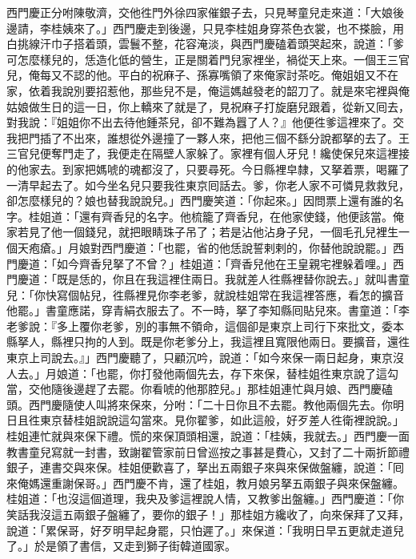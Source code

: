 西門慶正分咐陳敬濟，交他徃門外徐四家催銀子去，只見琴童兒走來道：「大娘後邊請，李桂姨來了。」西門慶走到後邊，只見李桂姐身穿茶色衣裳，也不搽臉，用白挑線汗巾子搭着頭，雲鬟不整，花容淹淡，與西門慶磕着頭哭起來，說道：「爹可怎麼樣兒的，恁造化低的營生，正是關着門兒家裡坐，禍從天上來。一個王三官兒，俺每又不認的他。平白的祝麻子、孫寡嘴領了來俺家討茶吃。俺姐姐又不在家，依着我說別要招惹他，那些兒不是，{}俺這媽越發老的韶刀了。就是來宅裡與俺姑娘做生日的這一日，你上轎來了就是了，見祝麻子打旋磨兒跟着，從新又囘去，對我說：『姐姐你不出去待他鍾茶兒，卻不難為囂了人？』他便徃爹這裡來了。交我把門插了不出來，誰想從外邊撞了一夥人來，把他三個不繇分說都拏的去了。王三官兒便奪門走了，我便走在隔壁人家躲了。家裡有個人牙兒！纔使保兒來這裡接的他家去。到家把媽唬的魂都沒了，只要尋死。今日縣裡皁隸，又拏着票，喝羅了一清早起去了。如今坐名兒只要我徃東京囘話去。爹，你老人家不可憐見救救兒，卻怎麼樣兒的？娘也替我說說兒。」{}西門慶笑道：「你起來。」因問票上還有誰的名字。桂姐道：「還有齊香兒的名字。他梳籠了齊香兒，在他家使錢，他便該當。{}俺家若見了他一個錢兒，就把眼睛珠子吊了；若是沾他沾身子兒，一個毛孔兒裡生一個天疱瘡。」月娘對西門慶道：「也罷，省的他恁說誓剌剌的，你替他說說罷。」西門慶道：「如今齊香兒拏了不曾？」桂姐道：「齊香兒他在王皇親宅裡躲着哩。」西門慶道：「既是恁的，你且在我這裡住兩日。我就差人徃縣裡替你說去。」就叫書童兒：「你快寫個帖兒，徃縣裡見你李老爹，就說桂姐常在我這裡答應，看怎的擴音他罷。」書童應諾，穿青絹衣服去了。不一時，拏了李知縣囘貼兒來。書童道：「李老爹說：『多上覆你老爹，別的事無不領命，這個卻是東京上司行下來批文，委本縣拏人，縣裡只拘的人到。既是你老爹分上，我這裡且寬限他兩日。要擴音，還徃東京上司說去。』」西門慶聽了，只顧沉吟，說道：「如今來保一兩日起身，東京沒人去。」月娘道：「也罷，你打發他兩個先去，存下來保，替桂姐徃東京說了這勾當，交他隨後邊趕了去罷。你看唬的他那腔兒。」那桂姐連忙與月娘、西門慶磕頭。{}西門慶隨使人叫將來保來，分咐：「二十日你且不去罷。教他兩個先去。你明日且徃東京替桂姐說說這勾當來。見你翟爹，如此這般，好歹差人徃衛裡說說。」桂姐連忙就與來保下禮。慌的來保頂頭相還，說道：「桂姨，我就去。」{}西門慶一面教書童兒寫就一封書，致謝翟管家前日曾巡按之事甚是費心，又封了二十兩折節禮銀子，連書交與來保。桂姐便歡喜了，拏出五兩銀子來與來保做盤纏，說道：「囘來俺媽還重謝保哥。」西門慶不肯，還了桂姐，教月娘另拏五兩銀子與來保盤纏。桂姐道：「也沒這個道理，我央及爹這裡說人情，又教爹出盤纏。」西門慶道：「你笑話我沒這五兩銀子盤纏了，要你的銀子！」{}那桂姐方纔收了，向來保拜了又拜，說道：「累保哥，好歹明早起身罷，只怕遲了。」來保道：「我明日早五更就走道兒了。」於是領了書信，又走到獅子街韓道國家。


